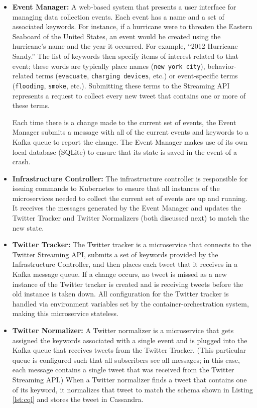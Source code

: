 \begin{itemize}
	\item \textbf{Event Manager:} A web-based system that presents a user interface for managing data collection events. Each event has a name and a set of associated keywords. For instance, if a hurricane were to threaten the Eastern Seaboard of the United States, an event would be created using the hurricane’s name and the year it occurred. For example, ``2012 Hurricane Sandy.'' The list of keywords then specify items of interest related to that event; these words are typically place names (\texttt{new york city}), behavior-related terms (\texttt{evacuate}, \texttt{charging devices}, etc.) or event-specific terms (\texttt{flooding}, \texttt{smoke}, etc.). Submitting these terms to the Streaming API represents a request to collect every new tweet that contains one or more of these terms.

  Each time there is a change made to the current set of events, the Event Manager submits a message with all of the current events and keywords to a Kafka queue to report the change. The Event Manager  makes use of its own local database (SQLite) to ensure that its state is saved in the event of a crash.

	\item \textbf{Infrastructure Controller:} The infrastructure controller is responsible for issuing commands to Kubernetes to ensure that all instances of the microservices needed to collect the current set of events are up and running. It receives the messages generated by the Event Manager and updates the Twitter Tracker and Twitter Normalizers (both discussed next) to match the new state.

	\item \textbf{Twitter Tracker:} The Twitter tracker is a microservice that connects to the Twitter Streaming API, submits a set of keywords provided by the Infrastructure Controller, and then places each tweet that it receives in a Kafka message queue. If a change occurs, no tweet is missed as a new instance of the Twitter tracker is created and is receiving tweets before the old instance is taken down. All configuration for the Twitter tracker is handled via environment variables set by the container-orchestration system, making this microservice stateless.

	\item \textbf{Twitter Normalizer:} A Twitter normalizer is a microservice that gets assigned the keywords associated with a single event and is plugged into the Kafka queue that receives tweets from the Twitter Tracker. (This particular queue is configured such that all subscribers see all messages; in this case, each message contains a single tweet that was received from the Twitter Streaming API.) When a Twitter normalizer finds a tweet that contains one of its keyword, it normalizes that tweet to match the schema shown in Listing \ref{lst:cql} and stores the tweet in Cassandra.


\end{itemize}
